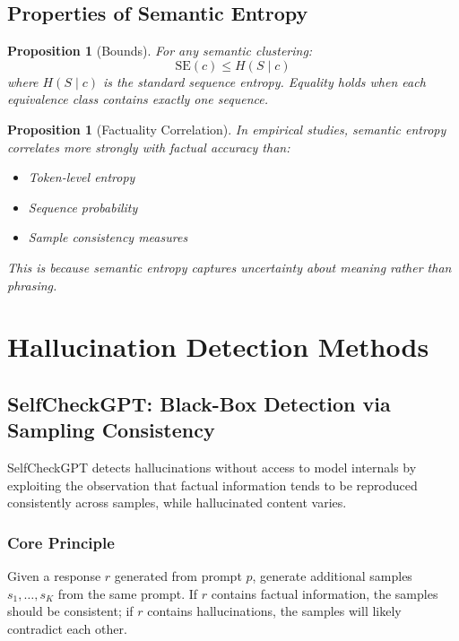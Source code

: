 \documentclass[11pt]{article}
\newtheorem{proposition}[theorem]{Proposition}
\begin{document}
\subsection{Properties of Semantic Entropy}

\begin{proposition}[Bounds]
For any semantic clustering:
\begin{equation}
\text{SE}(c) \leq H(S \mid c)
\end{equation}
where $H(S \mid c)$ is the standard sequence entropy. Equality holds when each equivalence class contains exactly one sequence.
\end{proposition}

\begin{proposition}[Factuality Correlation]
In empirical studies, semantic entropy correlates more strongly with factual accuracy than:
\begin{itemize}
    \item Token-level entropy
    \item Sequence probability
    \item Sample consistency measures
\end{itemize}
This is because semantic entropy captures uncertainty about meaning rather than phrasing.
\end{proposition}

\section{Hallucination Detection Methods}

\subsection{SelfCheckGPT: Black-Box Detection via Sampling Consistency}

SelfCheckGPT detects hallucinations without access to model internals by exploiting the observation that factual information tends to be reproduced consistently across samples, while hallucinated content varies.

\subsubsection{Core Principle}

Given a response $r$ generated from prompt $p$, generate additional samples $s_1, \ldots, s_K$ from the same prompt. If $r$ contains factual information, the samples should be consistent; if $r$ contains hallucinations, the samples will likely contradict each other.
\end{document}
